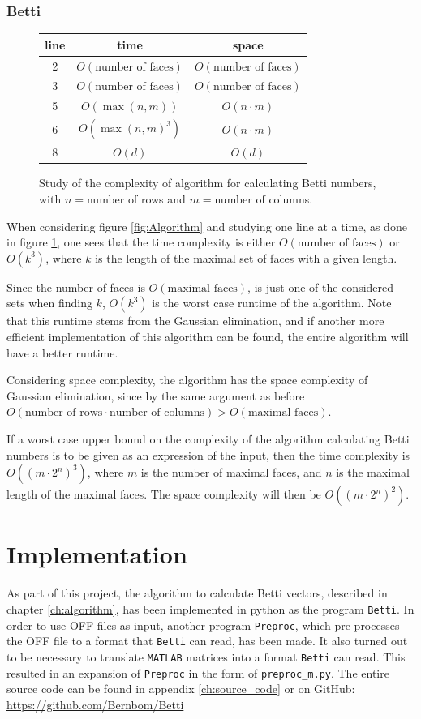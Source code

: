 \documentclass[11pt,a4paper,twoside]{report}
\begin{document}
\subsection{Betti}
\begin{figure}[H]
\center
\begin{tabular}{c|c|c}
line&time&space\\
\hline
2&$O(\text{number of faces})$&$O(\text{number of faces})$\\
3&$O(\text{number of faces})$&$O(\text{number of faces})$\\
5&$O(\max(n,m))$&$O(n\cdot m)$\\
6&$O(\max(n,m)^3)$&$O(n\cdot m)$\\
8&$O(d)$&$O(d)$\\
\end{tabular}
\caption{Study of the complexity of algorithm for calculating Betti numbers, with $n=$number of rows and $m=$number of columns.}
\label{fig:runtime}
\end{figure}
When considering figure \ref{fig:Algorithm} and studying one line at a time, as done in figure \ref{fig:runtime}, one sees that the time complexity is either $O(\text{number of faces})$ or $O(k^3)$, where $k$ is the length of the maximal set of faces with a given length.

Since the number of faces is $O(\text{maximal faces})$, is just one of the considered sets when finding $k$, $O(k^3)$ is the worst case runtime of the algorithm. Note that this runtime stems from the Gaussian elimination, and if another more efficient implementation of this algorithm can be found, the entire algorithm will have a better runtime.

Considering space complexity, the algorithm has the space complexity of Gaussian elimination, since by the same argument as before $O(\text{number of rows}\cdot \text{number of columns})>O(\text{maximal faces})$.

If a worst case upper bound on the complexity of the algorithm calculating Betti numbers is to be given as an expression of the input, then the time complexity is $O((m\cdot 2^n)^3)$, where $m$ is the number of maximal faces, and $n$ is the maximal length of the maximal faces. The space complexity will then be $O((m\cdot 2^n)^2)$.

\chapter{Implementation}
As part of this project, the algorithm to calculate Betti vectors, described in chapter \ref{ch:algorithm}, has been implemented in python as the program \texttt{Betti}. In order to use OFF files as input, another program \texttt{Preproc}, which pre-processes the OFF file to a format that \texttt{Betti} can read, has been made. It also turned out to be necessary to translate \texttt{MATLAB} matrices into a format \texttt{Betti} can read. This resulted in an expansion of \texttt{Preproc} in the form of \texttt{preproc\_m.py}.
The entire source code can be found in appendix \ref{ch:source_code} or on GitHub: \url{https://github.com/Bernbom/Betti}
\end{document}

